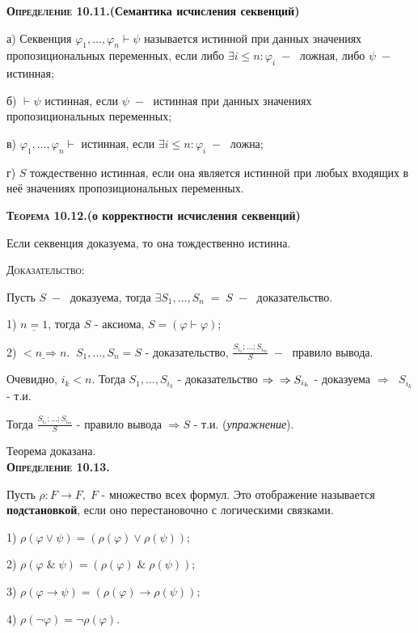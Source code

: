 \documentclass[18pt, a4paper]{extarticle}
\newcommand{\ampersand}{\;\&\;}
\begin{document}
\textbf{\textsc{Определение 10.11.}(Семантика исчисления секвенций)}

а) Секвенция $\varphi_1,\dots,\varphi_n\vdash\psi$ называется истинной при данных значениях пропозициональных переменных, если либо $\exists i\leqslant n: \varphi_i\; -\;$ ложная, либо
$\psi\;-\;$ истинная;

б) $\vdash\psi$ истинная, если $\psi\;-\;$ истинная при данных значениях пропозициональных переменных;

в) $\varphi_1,\dots,\varphi_n\vdash$ истинная, если $\exists i\leqslant n: \varphi_i\;-\;$ ложна;

г) $S$ тождественно истинная, если она является истинной при любых входящих в неё значениях пропозициональных переменных.
\newpage

\textbf{\textsc{Теорема 10.12.}(о корректности исчисления секвенций)}

Если секвенция доказуема, то она тождественно истинна.

\textsc{Доказательство:}

Пусть $S\;-\;$ доказуема, тогда $\exists S_1,\dots,S_n\;=\;S\;-\;$ доказательство.

1) $\underline{n=1}$, тогда $S$ -  аксиома, $S=(\varphi\vdash\varphi)$;

2) $\underline{<n\Rightarrow n}.\;\;S_1,\dots, S_n=S$ -  доказательство, $\displaystyle \frac{S_{i_1};\dots;S_{i_m}}{S}\;-\;$ правило вывода.

Очевидно, $i_k < n$. Тогда $S_1,\dots,S_{i_k}$ -  доказательство $\Rightarrow\newline\Rightarrow S_{i_k}$ -  доказуема $\Rightarrow\;$ $S_{i_k}$ -  т.и.

Тогда $\displaystyle \frac{S_{i_1};\dots;S_{i_m}}{S}$ - правило вывода $\Rightarrow S$ - т.и. (\textit{упражнение}).

Теорема доказана.\\

\textbf{\textsc{Определение 10.13.}} 

Пусть $\rho: F \to F,\;F$ -  множество всех формул. Это отображение называется \textbf{подстановкой}, если оно перестановочно с логическими связками.

1) $\rho(\varphi\vee\psi)=(\rho(\varphi)\vee\rho(\psi));$

2) $\rho(\varphi\ampersand\psi)=(\rho(\varphi)\ampersand\rho(\psi));$

3) $\rho(\varphi\to\psi)=(\rho(\varphi)\to\rho(\psi));$

4) $\rho(\lnot\varphi)=\lnot\rho(\varphi)$.\\
\end{document}
